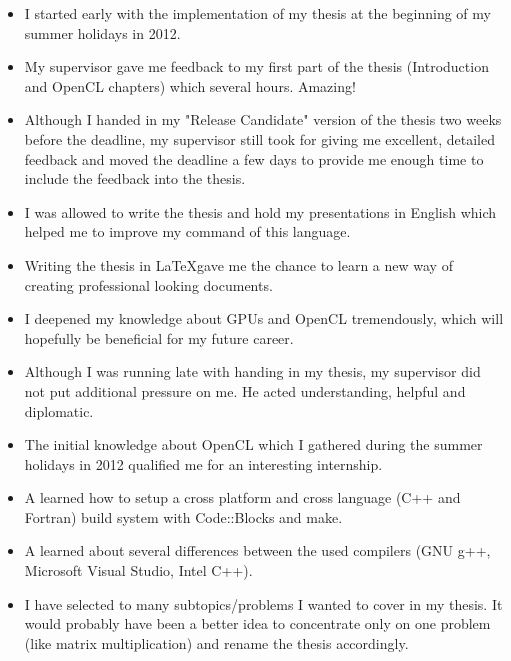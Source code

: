 \begin{itemize}
	\item[\positive] I started early with the implementation of my thesis at the beginning of my summer holidays in 2012.
	
	\item[\positive] My supervisor gave me feedback to my first part of the thesis (Introduction and OpenCL chapters) which several hours. Amazing!
	
	\item[\positive] Although I handed in my "Release Candidate" version of the thesis two weeks before the deadline, my supervisor still took for giving me excellent, detailed feedback and moved the deadline a few days to provide me enough time to include the feedback into the thesis.
	
	\item[\positive] I was allowed to write the thesis and hold my presentations in English which helped me to improve my command of this language.
	
	\item[\positive] Writing the thesis in \LaTeX gave me the chance to learn a new way of creating professional looking documents.
	 
	\item[\positive] I deepened my knowledge about GPUs and OpenCL tremendously, which will hopefully be beneficial for my future career.
	 
	\item[\positive] Although I was running late with handing in my thesis, my supervisor did not put additional pressure on me. He acted understanding, helpful and diplomatic.
	
	\item[\positive] The initial knowledge about OpenCL which I gathered during the summer holidays in 2012 qualified me for an interesting internship.
	
	\item[\positive] A learned how to setup a cross platform and cross language (C++ and Fortran) build system with Code::Blocks and make.
	
	\item[\positive] A learned about several differences between the used compilers (GNU g++, Microsoft Visual Studio, Intel C++).
	 
	\item[\negative] I have selected to many subtopics/problems I wanted to cover in my thesis. It would probably have been a better idea to concentrate only on one problem (like matrix multiplication) and rename the thesis accordingly.
	

\end{itemize}
